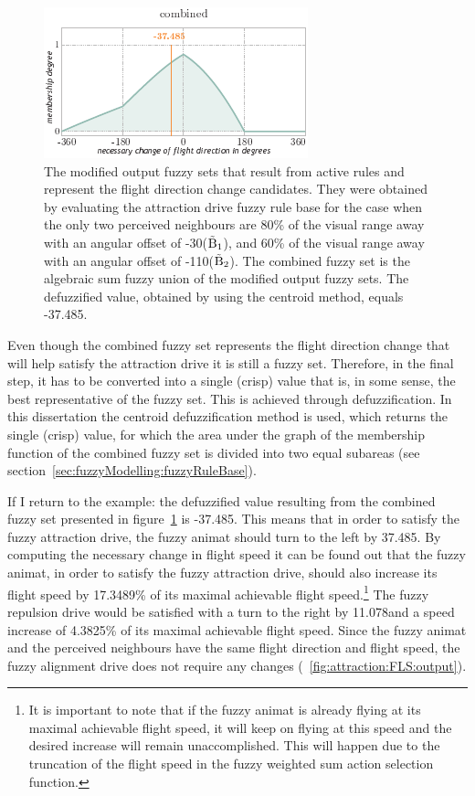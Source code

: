 \begin{figure}
\par\vspace*{2mm}
\includegraphics{fig[attractionFLScombined]g}
\par\vspace*{2mm}
\caption{The modified output fuzzy sets that result from active rules and represent the flight direction change candidates. They were obtained by evaluating the attraction drive fuzzy rule base for the case when the only two perceived neighbours are 80\% of the visual range away with an angular offset of -30\deg (${\tilde{\mathrm{B}}}_1$), and 60\% of the visual range away with an angular offset of -110\deg (${\tilde{\mathrm{B}}}_2$). The combined fuzzy set is the algebraic sum fuzzy union of the modified output fuzzy sets. The defuzzified value, obtained by using the centroid method, equals -37.485\deg.}
\label{fig:attraction:FLS:combined}
\end{figure}

Even though the combined fuzzy set represents the flight direction change that will help satisfy the attraction drive it is still a fuzzy set. Therefore, in the final step, it has to be converted into a single (crisp) value that is, in some sense, the best representative of the fuzzy set. This is achieved through defuzzification. In this dissertation the centroid defuzzification method is used, which  returns the single (crisp) value, for which the area under the graph of the membership function of the combined fuzzy set is divided into two equal subareas (see section~\ref{sec:fuzzyModelling:fuzzyRuleBase}).

If I return to the example: the defuzzified value resulting from the combined fuzzy set presented in figure~\ref{fig:attraction:FLS:combined} is -37.485\deg. This means that in order to satisfy the fuzzy attraction drive, the fuzzy animat should turn to the left by 37.485\deg. By computing the necessary change in flight speed it can be found out that the fuzzy animat, in order to satisfy the fuzzy attraction drive, should also increase its flight speed by 17.3489\% of its maximal achievable flight speed.\footnote{It is important to note that if the fuzzy animat is already flying at its maximal achievable flight speed, it will keep on flying at this speed and the desired increase will remain unaccomplished. This will happen due to the truncation of the flight speed in the fuzzy weighted sum action selection function.} The fuzzy repulsion drive would be satisfied with a turn to the right by 11.078\deg and a speed increase of 4.3825\% of its maximal achievable flight speed. Since the fuzzy animat and the perceived neighbours have the same flight direction and flight speed, the fuzzy alignment drive does not require any changes (\fig~\ref{fig:attraction:FLS:output}). 

